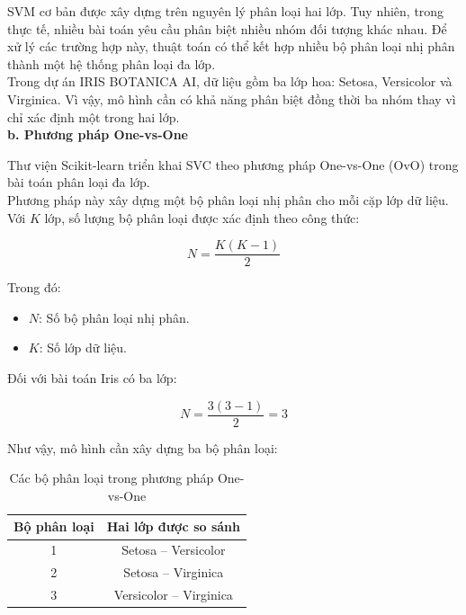 \documentclass[14pt]{extarticle}
\begin{document}
		\noindent
		SVM cơ bản được xây dựng trên nguyên lý phân loại hai lớp. Tuy nhiên, trong thực tế, nhiều bài toán yêu cầu phân biệt nhiều nhóm đối tượng khác nhau. Để xử lý các trường hợp này, thuật toán có thể kết hợp nhiều bộ phân loại nhị phân thành một hệ thống phân loại đa lớp.\\
		
		\noindent
		Trong dự án IRIS BOTANICA AI, dữ liệu gồm ba lớp hoa: Setosa, Versicolor và Virginica. Vì vậy, mô hình cần có khả năng phân biệt đồng thời ba nhóm thay vì chỉ xác định một trong hai lớp.\\
		
	\textbf{b. Phương pháp One-vs-One}
		
		\noindent
		Thư viện Scikit-learn triển khai SVC theo phương pháp One-vs-One (OvO) trong bài toán phân loại đa lớp.\\
		
		\noindent
		Phương pháp này xây dựng một bộ phân loại nhị phân cho mỗi cặp lớp dữ liệu. Với $K$ lớp, số lượng bộ phân loại được xác định theo công thức:
		
		\begin{equation*}
			N=\frac{K(K-1)}{2}
		\end{equation*}
		
		\noindent
		Trong đó:
		
		\begin{itemize}
			\item $N$: Số bộ phân loại nhị phân.
			\item $K$: Số lớp dữ liệu.
		\end{itemize}
		
		\noindent
		Đối với bài toán Iris có ba lớp:
		
		\begin{equation*}
			N=\frac{3(3-1)}{2}=3
		\end{equation*}
		
		\noindent
		Như vậy, mô hình cần xây dựng ba bộ phân loại:
		
		\begin{table}[H]
			\centering
			\caption{Các bộ phân loại trong phương pháp One-vs-One}
			\label{tab:ovo}
			\begin{tabular}{|c|c|}
				\hline
				\textbf{Bộ phân loại} & \textbf{Hai lớp được so sánh} \\
				\hline
				1 & Setosa -- Versicolor \\
				\hline
				2 & Setosa -- Virginica \\
				\hline
				3 & Versicolor -- Virginica \\
				\hline
			\end{tabular}
		\end{table}
		
\end{document}
